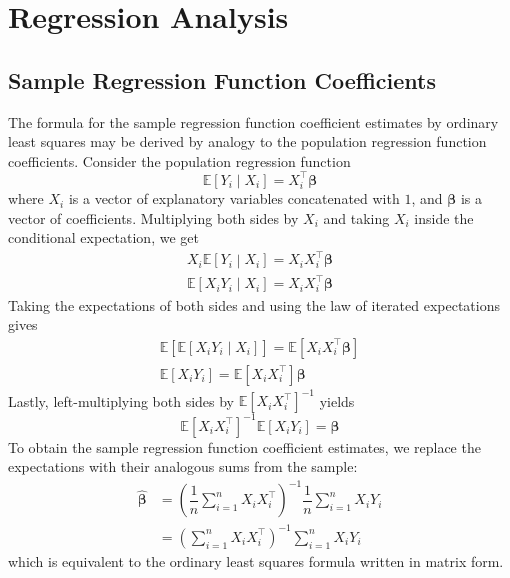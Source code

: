 \documentclass[11pt]{report} %
\begin{document}
\section{Regression Analysis}

\subsection{Sample Regression Function Coefficients}

The formula for the sample regression function coefficient estimates by ordinary least squares may be derived by analogy to the population regression function coefficients. Consider the population regression function
\begin{equation}
\mathbb{E}\left[Y_{i}\middle| X_{i}\right] = X_{i}^{\top}\boldsymbol{\beta}
\end{equation}
where $X_{i}$ is a vector of explanatory variables concatenated with $1$, and $\boldsymbol{\beta}$ is a vector of coefficients. Multiplying both sides by $X_{i}$  and taking $X_{i}$ inside the conditional expectation, we get
\begin{gather}
X_{i}\mathbb{E}\left[Y_{i}\middle| X_{i}\right] = X_{i}X_{i}^{\top}\boldsymbol{\beta} \\
\mathbb{E}\left[X_{i}Y_{i}\middle| X_{i}\right] = X_{i}X_{i}^{\top}\boldsymbol{\beta}
\end{gather}
Taking the expectations of both sides and using the law of iterated expectations gives
\begin{gather}
\mathbb{E}\left[\mathbb{E}\left[X_{i}Y_{i}\middle| X_{i}\right]\right] = \mathbb{E}\left[X_{i}X_{i}^{\top}\boldsymbol{\beta}\right] \\
\mathbb{E}\left[X_{i}Y_{i}\right] = \mathbb{E}\left[X_{i}X_{i}^{\top}\right]\boldsymbol{\beta}
\end{gather}
Lastly, left-multiplying both sides by $\mathbb{E}\left[X_{i}X_{i}^{\top}\right]^{-1}$ yields
\begin{equation}
\mathbb{E}\left[X_{i}X_{i}^{\top}\right]^{-1}\mathbb{E}\left[X_{i}Y_{i}\right] = \boldsymbol{\beta}
\end{equation}
To obtain the sample regression function coefficient estimates, we replace the expectations with their analogous sums from the sample:
\begin{align}
\widehat{\boldsymbol{\beta}} &= \left(\dfrac{1}{n}\sum_{i = 1}^{n}X_{i}X_{i}^{\top}\right)^{-1}\dfrac{1}{n}\sum_{i = 1}^{n}X_{i}Y_{i} \\
&= \left(\sum_{i = 1}^{n}X_{i}X_{i}^{\top}\right)^{-1}\sum_{i = 1}^{n}X_{i}Y_{i}
\end{align}
which is equivalent to the ordinary least squares formula written in matrix form.
\end{document}
